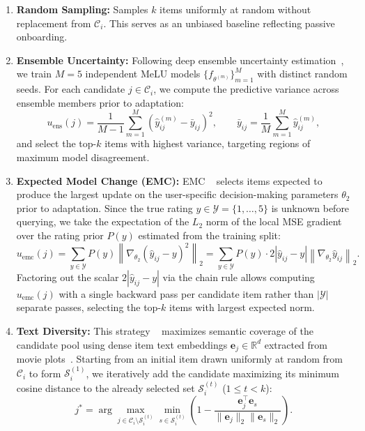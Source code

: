 \documentclass[10pt,twocolumn,letterpaper]{article}
\begin{document}
\begin{enumerate}
    \item \textbf{Random Sampling:} Samples $k$ items uniformly at random without replacement from $\mathcal{C}_i$. This serves as an unbiased baseline reflecting passive onboarding.

    \item \textbf{Ensemble Uncertainty:} Following deep ensemble uncertainty estimation~\cite{lakshminarayanan2017simple}, we train $M = 5$ independent MeLU models $\{f_{\theta^{(m)}}\}_{m=1}^{M}$ with distinct random seeds. For each candidate $j \in \mathcal{C}_i$, we compute the predictive variance across ensemble members prior to adaptation:
    \begin{equation}
        u_{\mathrm{ens}}(j) = \frac{1}{M - 1} \sum_{m=1}^{M} \left(\hat{y}_{ij}^{(m)} - \bar{y}_{ij}\right)^2, \qquad \bar{y}_{ij} = \frac{1}{M}\sum_{m=1}^{M} \hat{y}_{ij}^{(m)},
    \end{equation}
    and select the top-$k$ items with highest variance, targeting regions of maximum model disagreement.

    \item \textbf{Expected Model Change (EMC):} EMC ~\cite{settles2008multiple} selects items expected to produce the largest update on the user-specific decision-making parameters $\theta_2$ prior to adaptation. Since the true rating $y \in \mathcal{Y} = \{1, \dots, 5\}$ is unknown before querying, we take the expectation of the $L_2$ norm of the local MSE gradient over the rating prior $P(y)$ estimated from the training split:
    \begin{equation}
        u_{\mathrm{emc}}(j) = \sum_{y \in \mathcal{Y}} P(y) \left\| \nabla_{\theta_2} \left(\hat{y}_{ij} - y\right)^2 \right\|_2 = \sum_{y \in \mathcal{Y}} P(y) \cdot 2\left|\hat{y}_{ij} - y\right| \left\| \nabla_{\theta_2} \hat{y}_{ij} \right\|_2.
    \end{equation}
    Factoring out the scalar $2|\hat{y}_{ij} - y|$ via the chain rule allows computing $u_{\mathrm{emc}}(j)$ with a single backward pass per candidate item rather than $|\mathcal{Y}|$ separate passes, selecting the top-$k$ items with largest expected norm.

    \item \textbf{Text Diversity:} This strategy ~\cite{sener2018active} maximizes semantic coverage of the candidate pool using dense item text embeddings $\mathbf{e}_j \in \mathbb{R}^d$ extracted from movie plots~\cite{reimers2019sbert}. Starting from an initial item drawn uniformly at random from $\mathcal{C}_i$ to form $\mathcal{S}_i^{(1)}$, we iteratively add the candidate maximizing its minimum cosine distance to the already selected set $\mathcal{S}_i^{(t)}$ ($1 \le t < k$):
    \begin{equation}
        j^* = \arg\max_{j \in \mathcal{C}_i \setminus \mathcal{S}_i^{(t)}} \min_{s \in \mathcal{S}_i^{(t)}} \left( 1 - \frac{\mathbf{e}_j^\top \mathbf{e}_s}{\|\mathbf{e}_j\|_2 \|\mathbf{e}_s\|_2} \right).
    \end{equation}
\end{enumerate}
\end{document}
